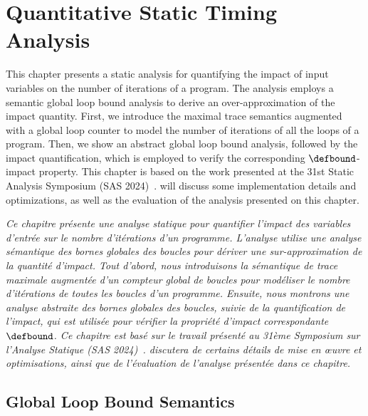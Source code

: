 
\setchapterpreamble[u]{\margintoc}

\chapter{Quantitative Static Timing Analysis}

This chapter presents a static analysis for quantifying the impact of input variables on the number of iterations of a program.
The analysis employs a semantic global loop bound analysis to derive an over-approximation of the impact quantity.
First, we introduce the maximal trace semantics augmented with a global loop counter to model the number of iterations of all the loops of a program.
Then, we show an abstract global loop bound analysis, followed by the impact quantification, which is employed to verify the corresponding $\defbound$-impact property.
This chapter is based on the work presented at the 31st Static Analysis Symposium (SAS 2024)~\cite{Mazzucato2024c}.
 will discuss some implementation details and optimizations, as well as the evaluation of the analysis presented on this chapter.

\emph{Ce chapitre présente une analyse statique pour quantifier l'impact des variables d'entrée sur le nombre d'itérations d'un programme. L'analyse utilise une analyse sémantique des bornes globales des boucles pour dériver une sur-approximation de la quantité d'impact. Tout d'abord, nous introduisons la sémantique de trace maximale augmentée d'un compteur global de boucles pour modéliser le nombre d'itérations de toutes les boucles d'un programme. Ensuite, nous montrons une analyse abstraite des bornes globales des boucles, suivie de la quantification de l'impact, qui est utilisée pour vérifier la propriété d'impact correspondante $\defbound$. Ce chapitre est basé sur le travail présenté au 31ème Symposium sur l'Analyse Statique (SAS 2024)~.  discutera de certains détails de mise en œuvre et optimisations, ainsi que de l'évaluation de l'analyse présentée dans ce chapitre.}



\section{Global Loop Bound Semantics}


